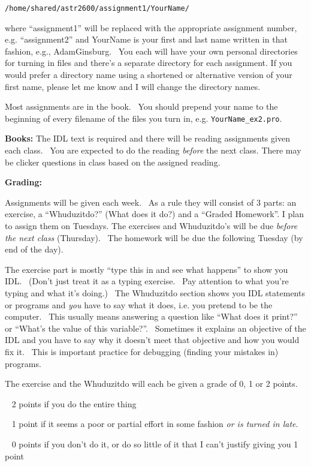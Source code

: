 \documentclass[]{article}
\begin{document}
\verb|/home/shared/astr2600/assignment1/YourName/|


where ``assignment1'' will be replaced with the appropriate assignment number,
e.g. ``assignment2'' and YourName is your first and last name written in that
fashion, e.g., AdamGinsburg.~ You each will have your own personal directories
for turning in files and there's a separate directory for each assignment.  If
you would prefer a directory name using a shortened or alternative version of
your first name, please let me know and I will change the directory names.


Most assignments are in the book.~ You should prepend your name to the
beginning of every filename of the files you turn in, e.g.
\verb|YourName_ex2.pro|.


\textbf{Books:} The IDL text is required and there will be reading assignments
given each class.~ You are expected to do the reading \emph{before} the
next class.  There may be clicker questions in class based on the assigned
reading.


\textbf{Grading:}

Assignments will be given each week.~ As a rule they will consist of 3
parts: an exercise, a ``Whuduzitdo?'' (What does it do?) and a ``Graded
Homework''. I plan to assign them on Tuesdays. The exercises and
Whuduzitdo's will be due \emph{before the next class} (Thursday).~ The
homework will be due the following Tuesday (by end of the day).


The exercise part is mostly ``type this in and see what happens'' to
show you IDL.~ (Don't just treat it as a typing exercise.~ Pay attention
to what you're typing and what it's doing.)~ The Whuduzitdo section
shows you IDL statements or programs and \emph{you} have to say what it
does, i.e. you pretend to be the computer.~ This usually means answering
a question like ``What does it print?'' or ``What's the value of this
variable?''.~ Sometimes it explains an objective of the IDL and you have
to say why it doesn't meet that objective and how you would fix it.~
This is important practice for debugging (finding your mistakes in)
programs.


The exercise and the Whuduzitdo will each be given a grade of 0, 1 or 2
points. ~

~ 2 points if you do the entire thing

~ 1 point if it seems a poor or partial effort in some fashion \emph{or
is turned in late}.

~ 0 points if you don't do it, or do so little of it that I can't
justify giving you 1 point
\end{document}
